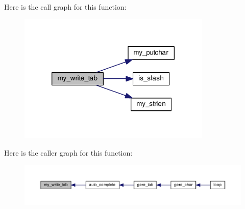 Here is the call graph for this function\-:\nopagebreak
\begin{figure}[H]
\begin{center}
\leavevmode
\includegraphics[width=260pt]{functions__complete_8c_aac577fdfca82ccd407b2105d39b56fce_cgraph}
\end{center}
\end{figure}




Here is the caller graph for this function\-:
\nopagebreak
\begin{figure}[H]
\begin{center}
\leavevmode
\includegraphics[width=350pt]{functions__complete_8c_aac577fdfca82ccd407b2105d39b56fce_icgraph}
\end{center}
\end{figure}


